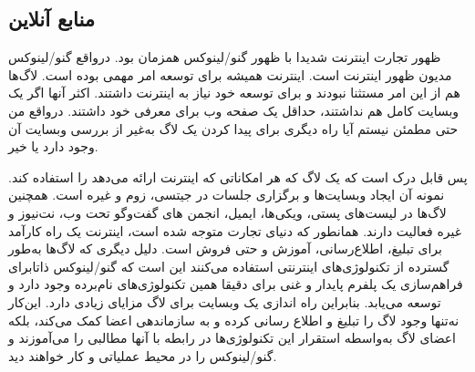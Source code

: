 \subsection{منابع آنلاین}

ظهور تجارت اینترنت شدیدا با ظهور گنو/لینوکس همزمان بود. درواقع
گنو/لینوکس مدیون ظهور اینترنت است. اینترنت همیشه برای توسعه امر مهمی بوده است.
لاگ‌ها هم از این امر مستثنا نبودند و برای توسعه خود نیاز به اینترنت داشتند.
اکثر آنها اگر یک وبسایت کامل هم نداشتند، حداقل یک صفحه وب برای معرفی خود داشتند.
درواقع من حتی مطمئن نیستم آیا راه دیگری برای پیدا کردن یک لاگ به‌غیر از بررسی وبسایت
آن وجود دارد یا خیر.

پس قابل درک است که یک لاگ که هر امکاناتی که اینترنت ارائه می‌دهد را استفاده کند.
نمونه آن ایجاد وبسایت‌ها و برگزاری جلسات در جیتسی، زوم و غیره است.
همچنین لاگ‌ها در لیست‌های پستی، ویکی‌ها، ایمیل، انجمن های گفت‌وگو تحت وب، نت‌نیوز و غیره
فعالیت دارند.
همانطور که دنیای تجارت متوجه شده است، اینترنت یک راه کارآمد برای تبلیغ، اطلاع‌رسانی،
آموزش و حتی فروش است.
دلیل دیگری که لاگ‌ها به‌طور گسترده از تکنولوژی‌های اینترنتی استفاده می‌کنند این است که
گنو/لینوکس ذاتابرای فراهم‌سازی یک پلفرم پایدار و غنی برای
دقیقا همین تکنولوژی‌های نام‌برده وجود دارد و توسعه می‌یابد.
بنابراین راه اندازی یک وبسایت برای لاگ مزایای زیادی دارد. این‌کار نه‌تنها وجود لاگ را
تبلیغ و اطلاع رسانی کرده و به سازماندهی اعضا کمک می‌کند، بلکه اعضای لاگ به‌واسطه
استقرار این تکنولوژی‌ها در رابطه با آنها مطالبی را می‌آموزند و گنو/لینوکس را در محیط
عملیاتی و کار خواهند دید.

